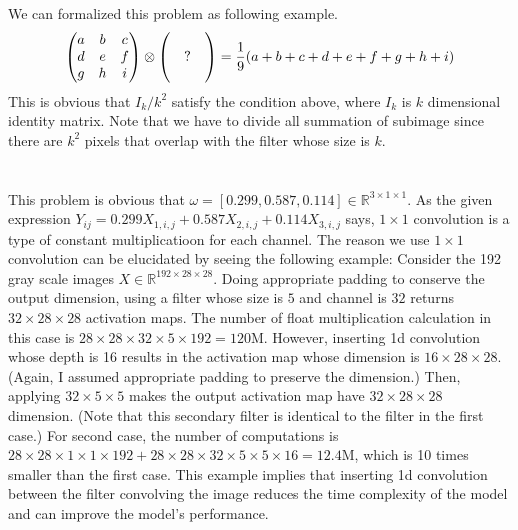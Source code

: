 \documentclass[10pt]{article}
\begin{document}
\section{}
We can formalized this problem as following example.
\begin{equation*}
    \begin{pmatrix}
        a & b & c \\ d & e & f \\ g & h & i
    \end{pmatrix}
    \otimes
    \begin{pmatrix}
        \empty & \empty & \empty \\ \empty & ? & \empty \\ \empty & \empty & \empty
    \end{pmatrix}
    = \frac{1}{9}(a + b + c + d + e + f + g + h + i)
\end{equation*}
This is obvious that $I_k/k^2$ satisfy the condition above, where $I_k$ is $k$ dimensional identity matrix.
Note that we have to divide all summation of subimage since there are $k^2$ pixels that overlap with the filter whose size is $k$.

\section{}
This problem is obvious that $\omega = [0.299, 0.587, 0.114]\in\mathbb{R}^{3\times 1 \times 1}$. 
As the given expression $Y_{ij} = 0.299X_{1,i,j} + 0.587 X_{2,i,j} + 0.114 X_{3,i,j}$ says, $1\times 1$ convolution is a type of constant multiplicatioon for each channel.
The reason we use $1\times 1$ convolution can be elucidated by seeing the following example: Consider the 192 gray scale images $X \in \mathbb{R}^{192\times 28 \times 28}$. Doing appropriate padding to conserve the output dimension, using a filter whose size is $5$ and channel is $32$ returns $32 \times 28 \times 28$ activation maps. 
The number of float multiplication calculation in this case is $28\times 28\times 32 \times 5 \times 192 = 120$M. However, inserting 1d convolution whose depth is 16 results in the activation map whose dimension is $16 \times 28 \times 28$.(Again, I assumed appropriate padding to preserve the dimension.) Then, applying $32\times 5 \times 5$ makes the output activation map have $32 \times 28 \times 28$ dimension. (Note that this secondary filter is identical to the filter in the first case.)
For second case, the number of computations is $28\times 28 \times 1 \times 1\times 192 + 28\times 28\times 32 \times 5 \times 5 \times 16 = 12.4$M, which is 10 times smaller than the first case.  
This example implies that inserting 1d convolution between the filter convolving the image reduces the time complexity of the model and can improve the model's performance.
\end{document}
